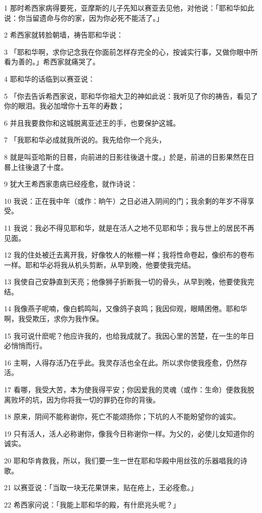 \par 1 那时希西家病得要死，亚摩斯的儿子先知以赛亚去见他，对他说：「耶和华如此说：你当留遗命与你的家，因为你必死不能活了。」
\par 2 希西家就转脸朝墙，祷告耶和华说：
\par 3 「耶和华啊，求你记念我在你面前怎样存完全的心，按诚实行事，又做你眼中所看为善的。」希西家就痛哭了。
\par 4 耶和华的话临到以赛亚说：
\par 5 「你去告诉希西家说，耶和华你祖大卫的神如此说：我听见了你的祷告，看见了你的眼泪。我必加增你十五年的寿数；
\par 6 并且我要救你和这城脱离亚述王的手，也要保护这城。
\par 7 「我耶和华必成就我所说的。我先给你一个兆头，
\par 8 就是叫亚哈斯的日晷，向前进的日影往後退十度。」於是，前进的日影果然在日晷上往後退了十度。
\par 9 犹大王希西家患病已经痊愈，就作诗说：
\par 10 我说：正在我中年（或作：晌午）之日必进入阴间的门；我余剩的年岁不得享受。
\par 11 我说：我必不得见耶和华，就是在活人之地不见耶和华；我与世上的居民不再见面。
\par 12 我的住处被迁去离开我，好像牧人的帐棚一样；我将性命卷起，像织布的卷布一样。耶和华必将我从机头剪断，从早到晚，他要使我完结。
\par 13 我使自己安静直到天亮；他像狮子折断我一切的骨头，从早到晚，他要使我完结。
\par 14 我像燕子呢喃，像白鹤鸣叫，又像鸽子哀鸣；我因仰观，眼睛困倦。耶和华啊，我受欺压，求你为我作保。
\par 15 我可说什麽呢？他应许我的，也给我成就了。我因心里的苦楚，在一生的年日必悄悄而行。
\par 16 主啊，人得存活乃在乎此。我灵存活也全在此。所以求你使我痊愈，仍然存活。
\par 17 看哪，我受大苦，本为使我得平安；你因爱我的灵魂（或作：生命）便救我脱离败坏的坑，因为你将我一切的罪扔在你的背後。
\par 18 原来，阴间不能称谢你，死亡不能颂扬你；下坑的人不能盼望你的诚实。
\par 19 只有活人，活人必称谢你，像我今日称谢你一样。为父的，必使儿女知道你的诚实。
\par 20 耶和华肯救我，所以，我们要一生一世在耶和华殿中用丝弦的乐器唱我的诗歌。
\par 21 以赛亚说：「当取一块无花果饼来，贴在疮上，王必痊愈。」
\par 22 希西家问说：「我能上耶和华的殿，有什麽兆头呢？」

